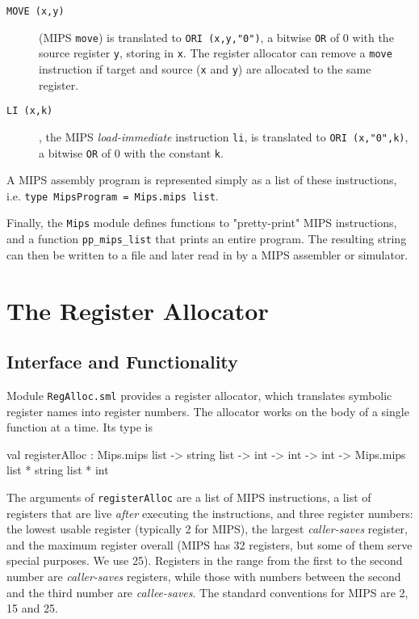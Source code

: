 \documentclass[11pt,a4paper]{article}
\newcommand{\codesize}{\scriptsize}
\newcommand{\cd}[1]{{{\codesize\tt #1}}}
\begin{document}
\begin{description}

\item[{\tt MOVE (x,y)}] (MIPS \cd{move}) is translated to {\tt ORI (x,y,"0")},
	a bitwise \cd{OR} of $0$ with the source register \cd{y}, storing in \cd{x}.
	The register allocator can remove a \cd{move} instruction if target
	and source (\cd{x} and \cd{y}) are allocated to the same register.

\item[{\tt LI (x,k)}], the MIPS \emph{load-immediate} instruction \cd{li}, 
	is translated to {\tt ORI (x,"0",k)}, a bitwise \cd{OR} of $0$ with 
	the constant \cd{k}.

\end{description}

\noindent
A MIPS assembly program is represented simply as a list of these instructions, i.e. 
\cd{type MipsProgram = Mips.mips~list}. 

Finally, the {\tt Mips} module defines
functions to "pretty-print" MIPS instructions, and a function \cd{pp\_mips\_list}
that prints an entire program. The resulting string can then be written to a file 
and later read in by a MIPS assembler or simulator.

\section{The Register Allocator}
\subsection{Interface and Functionality}
Module  \cd{RegAlloc.sml} provides a register allocator, which translates 
symbolic register names into register numbers. The allocator works on 
the body of a single function at a time. Its type is

\begin{code}[frame=lines, label=from \textit{RegAlloc.sig}]
  val registerAlloc :
    Mips.mips list -> string list -> int -> int -> int
    -> Mips.mips list * string list * int
\end{code}

The arguments of \cd{registerAlloc} are a list of MIPS instructions,
a list of registers that are live \emph{after} executing the instructions,
and three register numbers: the lowest usable register (typically 2 for MIPS),
the largest \emph{caller-saves} register, and the maximum register overall
(MIPS has 32 registers, but some of them serve special purposes. We use 25).
Registers in the range from the first to the second number are \emph{caller-saves}
registers, while those with numbers between the second and the third number are
\emph{callee-saves}. The standard conventions for MIPS are 2, 15 and 25.
\end{document}
